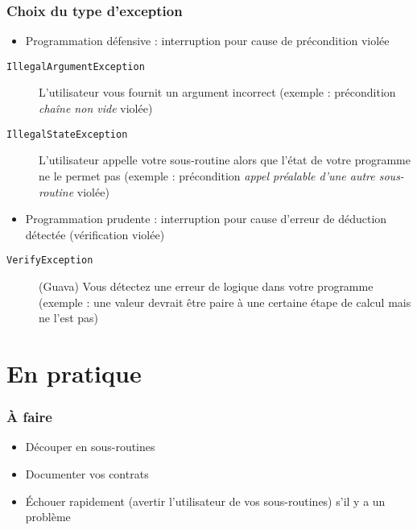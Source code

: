 \documentclass[english, french]{beamer}
\begin{document}
\begin{frame}
	\frametitle{Choix du type d’exception}
	\begin{itemize}
		\item Programmation défensive : interruption pour cause de précondition violée
	\end{itemize}
	\begin{description}%
		\item[\texttt{IllegalArgumentException}] L’utilisateur vous fournit un argument incorrect (exemple : précondition \emph{chaîne non vide} violée)
		\item[\texttt{IllegalStateException}] L’utilisateur appelle votre sous-routine alors que l’état de votre programme ne le permet pas (exemple : précondition \emph{appel préalable d’une autre sous-routine} violée)
	\end{description}
	\begin{itemize}
		\item Programmation prudente : interruption pour cause d’erreur de déduction détectée (vérification violée)
	\end{itemize}
	\begin{description}
		\item[\texttt{VerifyException}] (Guava) Vous détectez une erreur de logique dans votre programme (exemple : une valeur devrait être paire à une certaine étape de calcul mais ne l’est pas)
	\end{description}
\end{frame}

\section{En pratique}
\begin{frame}
	\frametitle{À faire}
	\begin{itemize}
		\item Découper en sous-routines
		\item Documenter vos contrats
		\item Échouer rapidement (avertir l’utilisateur de vos sous-routines) s’il y a un problème
	\end{itemize}
\end{frame}

\appendix
\end{document}
